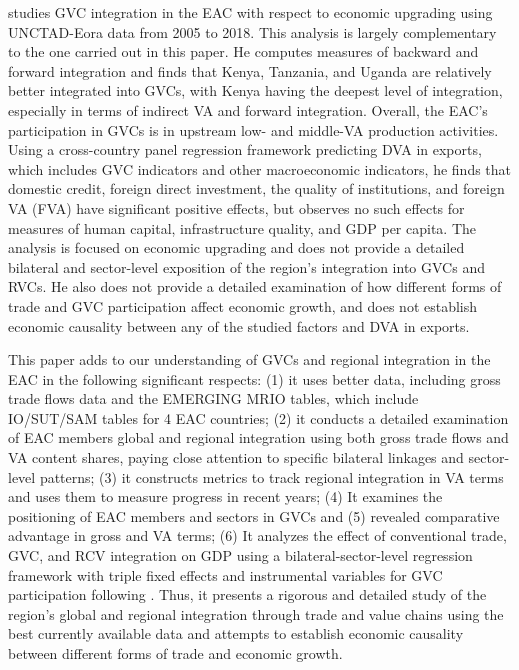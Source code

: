 \documentclass[a4paper]{article}
\begin{document}
\citet{lwesya2022integration} studies GVC integration in the EAC with respect to economic upgrading using UNCTAD-Eora data from 2005 to 2018. This analysis is largely complementary to the one carried out in this paper. He computes measures of backward and forward integration and finds that Kenya, Tanzania, and Uganda are relatively better integrated into GVCs, with Kenya having the deepest level of integration, especially in terms of indirect VA and forward integration. Overall, the EAC's participation in GVCs is in upstream low- and middle-VA production activities. Using a cross-country panel regression framework predicting DVA in exports, which includes GVC indicators and other macroeconomic indicators, he finds that domestic credit, foreign direct investment, the quality of institutions, and foreign VA (FVA) have significant positive effects, but observes no such effects for measures of human capital, infrastructure quality, and GDP per capita. The analysis is focused on economic upgrading and does not provide a detailed bilateral and sector-level exposition of the region's integration into GVCs and RVCs. He also does not provide a detailed examination of how different forms of trade and GVC participation affect economic growth, and does not establish economic causality between any of the studied factors and DVA in exports. \newline

This paper adds to our understanding of GVCs and regional integration in the EAC in the following significant respects: (1) it uses better data, including gross trade flows data and the EMERGING MRIO tables, which include IO/SUT/SAM tables for 4 EAC countries; (2) it conducts a detailed examination of EAC members global and regional integration using both gross trade flows and VA content shares, paying close attention to specific bilateral linkages and sector-level patterns; (3) it constructs metrics to track regional integration in VA terms and uses them to measure progress in recent years; (4) It examines the positioning of EAC members and sectors in GVCs and (5) revealed comparative advantage in gross and VA terms; (6) It analyzes the effect of conventional trade, GVC, and RCV integration on GDP using a bilateral-sector-level regression framework with triple fixed effects and instrumental variables for GVC participation following \citet{Kummritz20161}. Thus, it presents a rigorous and detailed study of the region's global and regional integration through trade and value chains using the best currently available data and attempts to establish economic causality between different forms of trade and economic growth. 
\end{document}
